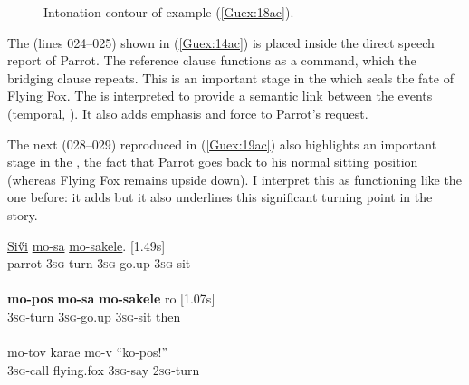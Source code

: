 \documentclass[output=paper]{LSP/langsci}
\begin{document}
\begin{figure}[ht]
\caption{Intonation contour of example (\ref{Guex:18ac}). \label{GuF7}}
\end{figure}

The  (lines 024--025) shown in (\ref{Guex:14ac}) is placed inside the direct speech report of Parrot. The reference clause functions as a command, which the bridging clause repeats. This is an important stage in the  which seals the fate of Flying Fox. The  is interpreted to provide a semantic link between the events (temporal, ). It also adds emphasis and force to Parrot’s request. 

The next  (028--029) reproduced in (\ref{Guex:19ac}) also highlights an important stage in the , the fact that Parrot goes back to his normal sitting position (whereas Flying Fox remains upside down). I interpret this  as functioning like the one before: it adds  but it also underlines this significant turning point in the story.

\begin{exe}
\ex \label{Guex:19ac}
\begin{xlist}
\ex \label{Guex:19a}
\gll \underline{Si\H{v}i}   \underline{}        \underline{mo-sa}        \underline{mo-sakele}.           [1.49s]\\
parrot   \textsc{3sg}-turn    \textsc{3sg}-go.up   \textsc{3sg}-sit \\
\glt {}\\
\ex \label{Guex:19b}
\gll \textbf{mo-pos}        \textbf{mo-sa}        \textbf{mo-sakele}          ro [1.07s]\\
\textsc{3sg}-turn    \textsc{3sg}-go.up   \textsc{3sg}-sit   then\\
\glt {}\\
\ex \label{Guex:19c}
\gll   mo-tov   karae     mo-v         ``ko-pos!''\\     	       
 \textsc{3sg}-call   flying.fox   \textsc{3sg}-say   \textsc{2sg}-turn\\
\glt {} 
\end{xlist}
\end{exe}
\end{document}
